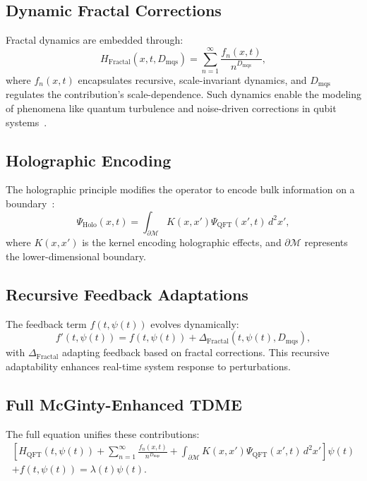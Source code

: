 \documentclass{article}
\theoremstyle{plain}
\begin{document}
\subsection{Dynamic Fractal Corrections}
Fractal dynamics are embedded through:
\begin{equation}
    H_{\text{Fractal}}(x, t, D_{\text{mqs}}) = \sum_{n=1}^\infty \frac{f_n(x, t)}{n^{D_{\text{mqs}}}},
\end{equation}
where \(f_n(x, t)\) encapsulates recursive, scale-invariant dynamics, and \(D_{\text{mqs}}\) regulates the contribution's scale-dependence. Such dynamics enable the modeling of phenomena like quantum turbulence and noise-driven corrections in qubit systems~\cite{Mandelbrot1983}.

\subsection{Holographic Encoding}
The holographic principle modifies the operator to encode bulk information on a boundary~\cite{Bousso2002, Susskind1995}:
\begin{equation}
    \Psi_{\text{Holo}}(x, t) = \int_{\partial \mathcal{M}} K(x, x') \Psi_{\text{QFT}}(x', t) \, d^2x',
\end{equation}
where \(K(x, x')\) is the kernel encoding holographic effects, and \(\partial \mathcal{M}\) represents the lower-dimensional boundary.

\subsection{Recursive Feedback Adaptations}
The feedback term \(f(t, \psi(t))\) evolves dynamically:
\begin{equation}
    f'(t, \psi(t)) = f(t, \psi(t)) + \Delta_{\text{Fractal}}(t, \psi(t), D_{\text{mqs}}),
\end{equation}
with \(\Delta_{\text{Fractal}}\) adapting feedback based on fractal corrections. This recursive adaptability enhances real-time system response to perturbations.

\subsection{Full McGinty-Enhanced TDME}
The full equation unifies these contributions:
\begin{align}
    \left[ H_{\text{QFT}}(t, \psi(t)) + \sum_{n=1}^\infty \frac{f_n(x, t)}{n^{D_{\text{mqs}}}} + \int_{\partial \mathcal{M}} K(x, x') \Psi_{\text{QFT}}(x', t) \, d^2x' \right] \psi(t) \nonumber \\
    + f(t, \psi(t)) = \lambda(t) \psi(t).
\end{align}
\end{document}
